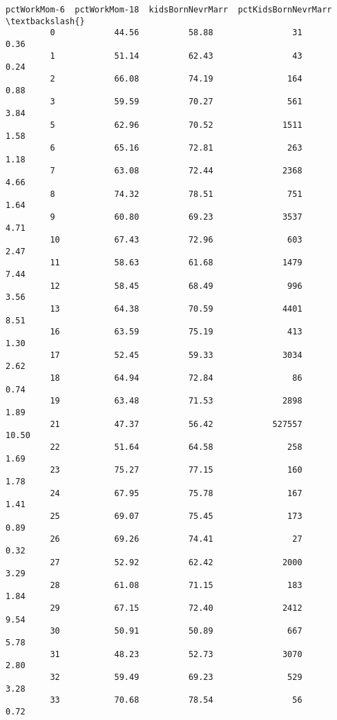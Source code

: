 \documentclass[11pt]{llncs}
\begin{document}
\begin{Verbatim}[commandchars=\\\{\}]
               pctWorkMom-6  pctWorkMom-18  kidsBornNevrMarr  pctKidsBornNevrMarr  \textbackslash{}
         0            44.56          58.88                31                 0.36   
         1            51.14          62.43                43                 0.24   
         2            66.08          74.19               164                 0.88   
         3            59.59          70.27               561                 3.84   
         5            62.96          70.52              1511                 1.58   
         6            65.16          72.81               263                 1.18   
         7            63.08          72.44              2368                 4.66   
         8            74.32          78.51               751                 1.64   
         9            60.80          69.23              3537                 4.71   
         10           67.43          72.96               603                 2.47   
         11           58.63          61.68              1479                 7.44   
         12           58.45          68.49               996                 3.56   
         13           64.38          70.59              4401                 8.51   
         16           63.59          75.19               413                 1.30   
         17           52.45          59.33              3034                 2.62   
         18           64.94          72.84                86                 0.74   
         19           63.48          71.53              2898                 1.89   
         21           47.37          56.42            527557                10.50   
         22           51.64          64.58               258                 1.69   
         23           75.27          77.15               160                 1.78   
         24           67.95          75.78               167                 1.41   
         25           69.07          75.45               173                 0.89   
         26           69.26          74.41                27                 0.32   
         27           52.92          62.42              2000                 3.29   
         28           61.08          71.15               183                 1.84   
         29           67.15          72.40              2412                 9.54   
         30           50.91          50.89               667                 5.78   
         31           48.23          52.73              3070                 2.80   
         32           59.49          69.23               529                 3.28   
         33           70.68          78.54                56                 0.72   

\end{Verbatim}
\end{document}
